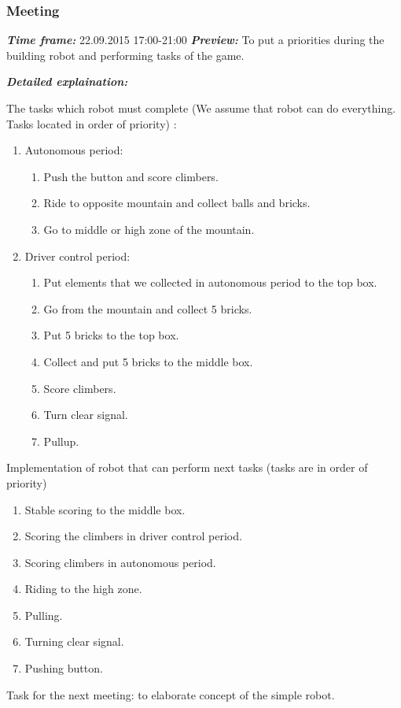 \addtocounter{number_of_meeting}{1}
\subsubsection{ Meeting}
	\textit{\textbf{Time frame:}} 22.09.2015 17:00-21:00 \newline
	\textit{\textbf{Preview:}} To put a priorities during the building robot and performing tasks of the game.\newline \newline
  
  \newline
  \textit{\textbf{Detailed explaination:}}
  \begin{enumerate*}
  	\item The tasks which robot must complete (We assume that robot can do everything. Tasks located in order of priority) :
  	\begin{enumerate}
  		\item Autonomous period:
  		\begin{enumerate}
  			\item Push the button and score climbers.
  			\item Ride to opposite mountain and collect balls and bricks.
  			\item Go to middle or high zone of the mountain.
  		\end{enumerate}
  		\item Driver control period:
  		\begin{enumerate}
	  		\item Put elements that we collected in autonomous period to the top box.
	  		\item Go from the mountain and collect 5 bricks.
	  		\item Put 5 bricks to the top box.
	  		\item Collect and put 5 bricks to the middle box.
	  		\item Score climbers.
	  		\item Turn clear signal.
	  		\item Pullup.
  		\end{enumerate}
  	\end{enumerate}
  	\item Implementation of robot that can perform next tasks (tasks are in order of priority)
  	\begin{enumerate}
  		\item Stable scoring to the middle box.
  		\item Scoring the climbers in driver control period.
  		\item Scoring climbers in autonomous period.
  		\item Riding to the high zone.
  		\item Pulling.
  		\item Turning clear signal.
  		\item Pushing button.
  	\end{enumerate}
	\newline
	
	Task for the next meeting: to elaborate concept of the simple robot.
  	
  \end{enumerate*}
  

  


\fillpage
